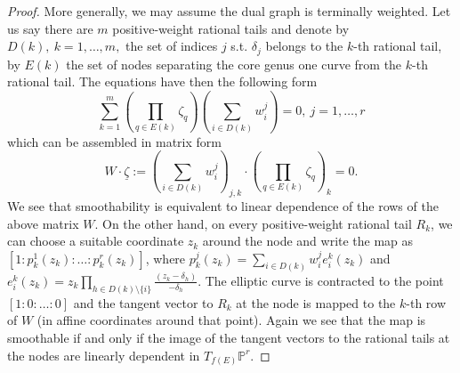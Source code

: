 \documentclass[11pt]{amsart}
\newcommand{\PP}{\mathbb P}
\renewcommand{\to}{\rightarrow}
\newcommand{\bcd}{\begin{center}\begin{tikzcd}}
\newcommand{\ecd}{\end{tikzcd}\end{center}}
\theoremstyle{plain}
\theoremstyle{definition}
\begin{document}
\begin{proof}
 More generally, we may assume the dual graph is terminally weighted. Let us say there are $m$ positive-weight rational tails and denote by $D(k),\ k=1,\ldots,m,$ the set of indices $j$ s.t. $\delta_j$ belongs to the $k$-th rational tail, by $E(k)$ the set of nodes separating the core genus one curve from the $k$-th rational tail. The equations have then the following form
 $$\sum_{k=1}^m(\prod_{q\in E(k)}\zeta_q)(\sum_{i\in D(k)}w_i^j)=0,\ j=1,\ldots,r$$
 which can be assembled in matrix form
 $$W\cdot\underline\zeta:=(\sum_{i\in D(k)}w_i^j)_{j,k}\cdot(\prod_{q\in E(k)}\zeta_q)_k=0.$$
 We see that smoothability is equivalent to linear dependence of the rows of the above matrix $W$. On the other hand, on every positive-weight rational tail $R_k$, we can choose a suitable coordinate $z_k$ around the node and write the map as $[1:p_k^1(z_k):\ldots:p_k^r(z_k)]$, where $p_k^j(z_k)=\sum_{i\in D(k)}w_i^je_i^k(z_k)$ and $e_i^k(z_k)=z_k\prod_{h\in D(k)\setminus\{i\}}\frac{(z_k-\delta_h)}{-\delta_h}$. The elliptic curve is contracted to the point $[1:0:\ldots:0]$ and the tangent vector to $R_k$ at the node is mapped to the $k$-th row of $W$ (in affine coordinates around that point). Again we see that the map is smoothable if and only if the image of the tangent vectors to the rational tails at the nodes are linearly dependent in $T_{f(E)}\PP^r$.

\end{proof}
\end{document}
